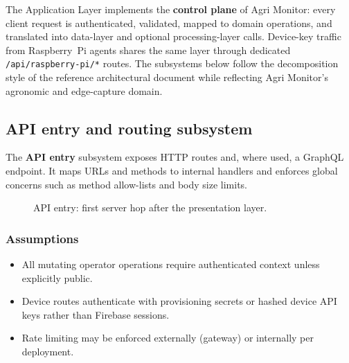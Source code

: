 The Application Layer implements the \textbf{control plane} of Agri Monitor: every client request is authenticated, validated, mapped to domain operations, and translated into data-layer and optional processing-layer calls. Device-key traffic from Raspberry~Pi agents shares the same layer through dedicated \texttt{/api/raspberry-pi/*} routes. The subsystems below follow the decomposition style of the reference architectural document while reflecting Agri Monitor's agronomic and edge-capture domain.

\subsection{API entry and routing subsystem}

The \textbf{API entry} subsystem exposes HTTP routes and, where used, a GraphQL endpoint. It maps URLs and methods to internal handlers and enforces global concerns such as method allow-lists and body size limits.

\begin{figure}[H]
\centering
{}
\caption{API entry: first server hop after the presentation layer.}
\label{fig:app-api}
\end{figure}

\subsubsection{Assumptions}
\begin{itemize}
  \item All mutating operator operations require authenticated context unless explicitly public.
  \item Device routes authenticate with provisioning secrets or hashed device API keys rather than Firebase sessions.
  \item Rate limiting may be enforced externally (gateway) or internally per deployment.
\end{itemize}

